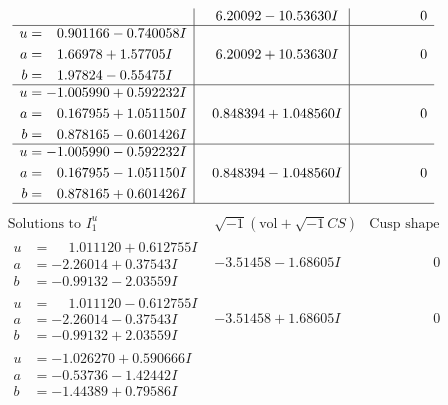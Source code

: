 \documentclass[1p]{elsarticle_modified}
\theoremstyle{definition}
\newcommand{\I}{\sqrt{-1}}
\begin{document}
$$\begin{array}{c|c|c}
 & \phantom{-}6.20092 - 10.53630 I & \phantom{-0.000000 } 0 \\ \hline\begin{aligned}
u &= \phantom{-}0.901166 - 0.740058 I \\
a &= \phantom{-}1.66978 + 1.57705 I \\
b &= \phantom{-}1.97824 - 0.55475 I\end{aligned}
 & \phantom{-}6.20092 + 10.53630 I & \phantom{-0.000000 } 0 \\ \hline\begin{aligned}
u &= -1.005990 + 0.592232 I \\
a &= \phantom{-}0.167955 + 1.051150 I \\
b &= \phantom{-}0.878165 - 0.601426 I\end{aligned}
 & \phantom{-}0.848394 + 1.048560 I & \phantom{-0.000000 } 0 \\ \hline\begin{aligned}
u &= -1.005990 - 0.592232 I \\
a &= \phantom{-}0.167955 - 1.051150 I \\
b &= \phantom{-}0.878165 + 0.601426 I\end{aligned}
 & \phantom{-}0.848394 - 1.048560 I & \phantom{-0.000000 } 0\\
 \hline 
 \end{array}$$\newpage$$\begin{array}{c|c|c}  
\text{Solutions to }I^u_{1}& \I (\text{vol} + \sqrt{-1}CS) & \text{Cusp shape}\\
 \hline 
\begin{aligned}
u &= \phantom{-}1.011120 + 0.612755 I \\
a &= -2.26014 + 0.37543 I \\
b &= -0.99132 - 2.03559 I\end{aligned}
 & -3.51458 - 1.68605 I & \phantom{-0.000000 } 0 \\ \hline\begin{aligned}
u &= \phantom{-}1.011120 - 0.612755 I \\
a &= -2.26014 - 0.37543 I \\
b &= -0.99132 + 2.03559 I\end{aligned}
 & -3.51458 + 1.68605 I & \phantom{-0.000000 } 0 \\ \hline\begin{aligned}
u &= -1.026270 + 0.590666 I \\
a &= -0.53736 - 1.42442 I \\
b &= -1.44389 + 0.79586 I\end{aligned}

\end{array}$$
\end{document}
